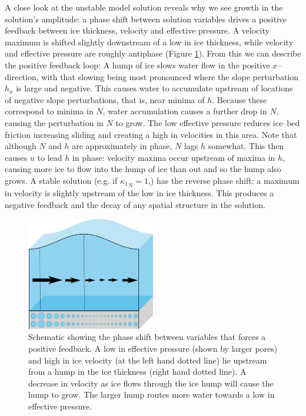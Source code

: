 \documentclass[journal abbreviation, manuscript]{copernicus}
\begin{document}
A close look at the unstable model solution reveals why we see growth in the solution's amplitude: 
a phase shift between solution variables drives a positive feedback between ice thickness, velocity and effective pressure. A velocity maximum is shifted slightly downstream of a low in ice thickness, while velocity and effective pressure are roughly antiphase (Figure \ref{fig:schematic_unstable}).  From this we can describe the positive feedback loop:
 A hump of ice slows water flow in the positive 
$x$--direction, with that slowing being most pronounced where the slope perturbation $h_x$ is large and negative. This causes water to accumulate 
upstream of locations of negative slope perturbations, that is, near 
minima of $h$. Because these correspond to minima in $N$, water accumulation 
causes a further drop in $N$, causing the perturbation in $N$ to grow.
The low effective pressure reduces ice--bed friction increasing sliding and creating a high in velocities in this area.
Note that although $N$ and $h$ are approximately in phase, $N$ lags $h$ somewhat. This then causes $u$ to lead $h$ in phase: velocity maxima occur upstream of maxima in $h$, 
causing more ice to flow into the hump of ice than out and so the hump also 
grows. 
A stable solution (e.g. if ${\kappa_1}_N=1$,)  has the reverse phase shift: a maximum in velocity is slightly upstream of the low in ice thickness. This produces a negative feedback and the decay of any spatial structure in the solution.

\begin{figure}[htb!]
\centering
\includegraphics[width=0.5\textwidth]{pictures/schematic_mechanism_unstable.png}
\caption[Schematic showing the phase shift between variables that forces a positive feedback.]{Schematic showing the phase shift between variables that forces a positive feedback. A low in effective pressure (shown by larger pores) and high in ice velocity (at the left hand dotted line) lie upstream from a hump in the ice thickness (right hand dotted line). A decrease in velocity as ice flows through the ice hump will cause the hump to grow. The larger hump routes more water towards a low in effective pressure.}
\label{fig:schematic_unstable}
\end{figure}
\end{document}
